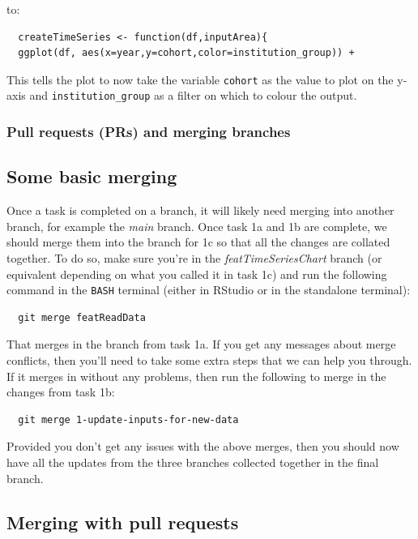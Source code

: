 \documentclass[
  12pt,
]{article}
\begin{document}
to:

\begin{verbatim}
  createTimeSeries <- function(df,inputArea){
  ggplot(df, aes(x=year,y=cohort,color=institution_group)) + 
\end{verbatim}

This tells the plot to now take the variable \texttt{cohort} as the
value to plot on the y-axis and \texttt{institution\_group} as a filter
on which to colour the output.

\hypertarget{pull-requests-prs-and-merging-branches}{%
\subsubsection{Pull requests (PRs) and merging
branches}\label{pull-requests-prs-and-merging-branches}}

\hypertarget{some-basic-merging}{%
\subsection{Some basic merging}\label{some-basic-merging}}

Once a task is completed on a branch, it will likely need merging into
another branch, for example the \emph{main} branch. Once task 1a and 1b
are complete, we should merge them into the branch for 1c so that all
the changes are collated together. To do so, make sure you're in the
\emph{featTimeSeriesChart} branch (or equivalent depending on what you
called it in task 1c) and run the following command in the \texttt{BASH}
terminal (either in RStudio or in the standalone terminal):

\begin{verbatim}
  git merge featReadData
\end{verbatim}

That merges in the branch from task 1a. If you get any messages about
merge conflicts, then you'll need to take some extra steps that we can
help you through. If it merges in without any problems, then run the
following to merge in the changes from task 1b:

\begin{verbatim}
  git merge 1-update-inputs-for-new-data
\end{verbatim}

Provided you don't get any issues with the above merges, then you should
now have all the updates from the three branches collected together in
the final branch.

\hypertarget{merging-with-pull-requests}{%
\subsection{Merging with pull
requests}\label{merging-with-pull-requests}}
\end{document}
